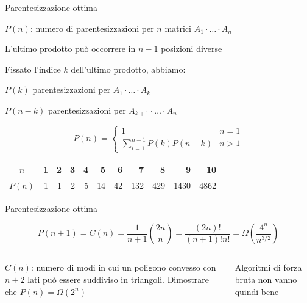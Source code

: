 \begin{frame}{Parentesizzazione ottima}

\vspace{-6pt}
\BIL
\item $P(n)$: numero di parentesizzazioni per $n$ matrici $A_1 \cdot \ldots \cdot A_n$
\item L'ultimo prodotto può occorrere in $n-1$ posizioni diverse
\item Fissato l'indice $k$ dell'ultimo prodotto, abbiamo:
\BI
\item $P(k)$ parentesizzazioni per $A_1 \cdot \ldots \cdot A_k$
\item $P(n-k)$ parentesizzazioni per $A_{k+1} \cdot \ldots \cdot A_n$
\EI
\EIL

\[
  P(n) = \begin{cases}
    1 & n = 1 \\
    \sum_{i=1}^{n-1} P(k)P(n-k) & n>1
    \end{cases}
\]

\smallskip
\begin{center}
\begin{tabular}{|c|r|r|r|r|r|r|r|r|r|r|}
\hline
$n$ & \phantom{0}1 & \phantom{0}2 & \phantom{0}3 & \phantom{0}4 & \phantom{0}5 & \phantom{0}6 & \phantom{0}7 & \phantom{0}8 & \phantom{0}9 & \phantom{0}10 \\\hline
$P(n)$ & 1 & 1 & 2 & 5 & 14 & 42 & 132 & 429 & 1430 & 4862 \\\hline
\end{tabular}
\end{center}
\end{frame}

\begin{frame}{Parentesizzazione ottima}

\vspace{-6pt}
\begin{myboxtitle}
\[
P(n+1) = C(n) = \frac{1}{n+1} {2n\choose n} = \frac{(2n)!}{(n+1)!n!} = \Omega\left(\frac{4^n}{n^{3/2}}\right)
\]
\end{myboxtitle}

\begin{columns}[T]
$C(n)$: numero di modi in cui un poligono convesso con $n+2$ lati può essere suddiviso in triangoli.
Dimostrare che $P(n) = \Omega(2^n)$

Algoritmi di forza bruta non vanno quindi bene
\end{columns}

\end{frame}

